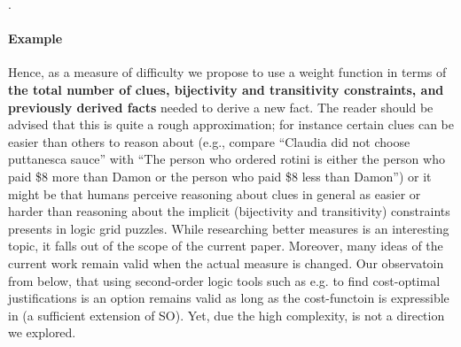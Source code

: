 

.

\paragraph{Example} 
Hence, as a measure of difficulty we propose to use a weight function in terms of \textbf{the total number of clues, bijectivity and transitivity constraints, and previously derived facts} needed to derive a new fact. 
The reader should be advised that this is quite a rough approximation; for instance certain clues can be easier than others to reason about (e.g., compare ``Claudia did not choose puttanesca sauce'' with ``The person who ordered rotini is either the person who paid \$8 more than Damon or the person who paid \$8 less than Damon'') or it might be that humans perceive reasoning about clues in general as easier or harder than reasoning about the implicit (bijectivity and transitivity) constraints presents in logic grid puzzles. While researching better measures is an interesting topic, it falls out of the scope of the current paper. Moreover, many ideas of the current work remain valid when the actual measure is changed. 
Our observatoin from below, that using second-order logic tools such as e.g. \cite{proB,kr/BogaertsTS16} to find cost-optimal justifications is an option remains valid as long as the cost-functoin is expressible in (a sufficient extension of SO). Yet, due the high complexity, is not a direction we explored. 


